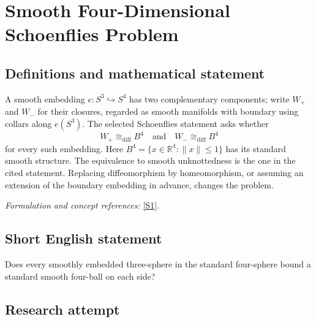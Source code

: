 \documentclass[11pt,a4paper]{article}
\newcommand{\R}{\mathbb{R}}
\newcommand{\sref}[2]{\hyperlink{source:#1:#2}{[S#2]}}
\newif\ifshowcatalogue
\newcommand{\cataloguescope}[1]{\ifshowcatalogue
 \paragraph{Exact scope in the supplied catalogue.}
 \begin{quote}\small #1\end{quote}\fi}
\numberwithin{equation}{section}
\begin{document}
\setcounter{section}{164}
\clearpage
\section{\texorpdfstring{Smooth Four-Dimensional Schoenflies Problem}{Smooth Four-Dimensional Schoenflies Problem}}\label{165}
\subsection{Definitions and mathematical statement}
A smooth embedding $e:S^3\hookrightarrow S^4$ has two complementary components; write $W_+$ and $W_-$ for their closures, regarded as smooth manifolds with boundary using collars along $e(S^3)$. The selected Schoenflies statement asks whether
\[
 W_+\cong_{\mathrm{diff}}B^4\quad\text{and}\quad W_-\cong_{\mathrm{diff}}B^4
\]
for every such embedding. Here $B^4=\{x\in\R^4:\|x\|\le1\}$ has its standard smooth structure. The equivalence to smooth unknottedness is the one in the cited statement. Replacing diffeomorphism by homeomorphism, or assuming an extension of the boundary embedding in advance, changes the problem.
\par\smallskip\textit{Formulation and concept references:} \sref{165}{1}.
\cataloguescope{Determine whether every smooth embedding of S\textasciicircum{}3 in S\textasciicircum{}4 is smoothly unknotted; equivalently, whether each of its two complementary closures is diffeomorphic to the standard 4-ball B\textasciicircum{}4.}
\subsection{Short English statement}
Does every smoothly embedded three-sphere in the standard four-sphere bound a standard smooth four-ball on each side?
\subsection{Research attempt}
\end{document}
